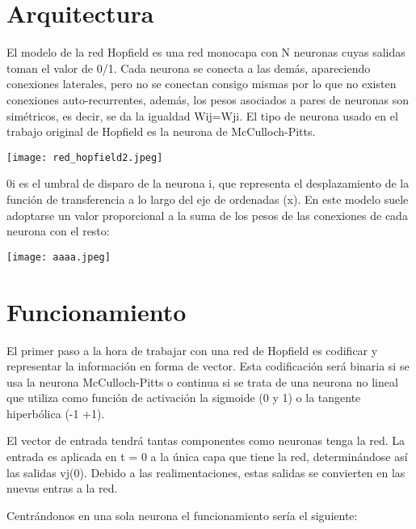 \documentclass[12pt]{article}
\begin{document}
\section*{Arquitectura}

El modelo de la red Hopfield es una red monocapa con N neuronas cuyas salidas toman el valor de 0/1. Cada neurona se conecta a las demás, apareciendo conexiones laterales, pero no se conectan consigo mismas por lo que no existen conexiones auto-recurrentes, además, los pesos asociados a pares de neuronas son simétricos, es decir, se da la igualdad Wij=Wji. El tipo de neurona usado en el trabajo original de Hopfield es la neurona de McCulloch-Pitts. 

    \begin{center}
    \texttt{[image: red\_hopfield2.jpeg]}
    \end{center}

0i es el umbral de disparo de la neurona i, que representa el desplazamiento de la función de transferencia a lo largo del eje de ordenadas (x). En este modelo suele adoptarse un valor proporcional a la suma de los pesos de las conexiones de cada neurona con el resto: 
    
    \begin{center}
    \texttt{[image: aaaa.jpeg]}
    \end{center}
    
    \section*{Funcionamiento}
    
El primer paso a la hora de trabajar con una red de Hopfield es codificar y representar la información en forma de vector. Esta codificación será binaria si se usa la neurona McCulloch-Pitts o continua si se trata de una neurona no lineal que utiliza como función de activación la sigmoide (0 y 1) o la tangente hiperbólica (-1 +1). 

El vector de entrada tendrá tantas componentes como neuronas tenga la red. La entrada es aplicada en t = 0 a la única capa que tiene la red, determinándose así las salidas vj(0). Debido a las realimentaciones, estas salidas se convierten en las nuevas entras a la red.

Centrándonos en una sola neurona el funcionamiento sería el siguiente:
\end{document}
